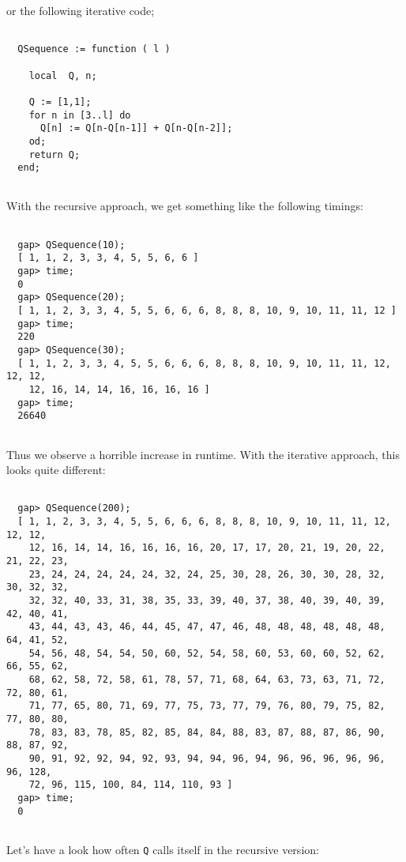 \documentclass[a4paper,11pt]{report}
\begin{document}
{{\begin{description}
\begin{Verbatim}[fontsize=\small,frame=single,label=GAP code]
\end{Verbatim}
 or the following iterative code; 
\begin{Verbatim}[fontsize=\small,frame=single,label=GAP code]
  
  QSequence := function ( l )
  
    local  Q, n;
  
    Q := [1,1];
    for n in [3..l] do
      Q[n] := Q[n-Q[n-1]] + Q[n-Q[n-2]];
    od;
    return Q;
  end;
  
\end{Verbatim}
 With the recursive approach, we get something like the following timings: 
\begin{Verbatim}[fontsize=\small,frame=single,label=GAP session log]
  
  gap> QSequence(10);
  [ 1, 1, 2, 3, 3, 4, 5, 5, 6, 6 ]
  gap> time;
  0
  gap> QSequence(20);
  [ 1, 1, 2, 3, 3, 4, 5, 5, 6, 6, 6, 8, 8, 8, 10, 9, 10, 11, 11, 12 ]
  gap> time;
  220
  gap> QSequence(30);
  [ 1, 1, 2, 3, 3, 4, 5, 5, 6, 6, 6, 8, 8, 8, 10, 9, 10, 11, 11, 12, 12, 12, 
    12, 16, 14, 14, 16, 16, 16, 16 ]
  gap> time;
  26640
  
\end{Verbatim}
 Thus we observe a horrible increase in runtime. With the iterative approach,
this looks quite different: 
\begin{Verbatim}[fontsize=\small,frame=single,label=GAP session log]
  
  gap> QSequence(200);
  [ 1, 1, 2, 3, 3, 4, 5, 5, 6, 6, 6, 8, 8, 8, 10, 9, 10, 11, 11, 12, 12, 12, 
    12, 16, 14, 14, 16, 16, 16, 16, 20, 17, 17, 20, 21, 19, 20, 22, 21, 22, 23, 
    23, 24, 24, 24, 24, 24, 32, 24, 25, 30, 28, 26, 30, 30, 28, 32, 30, 32, 32, 
    32, 32, 40, 33, 31, 38, 35, 33, 39, 40, 37, 38, 40, 39, 40, 39, 42, 40, 41, 
    43, 44, 43, 43, 46, 44, 45, 47, 47, 46, 48, 48, 48, 48, 48, 48, 64, 41, 52, 
    54, 56, 48, 54, 54, 50, 60, 52, 54, 58, 60, 53, 60, 60, 52, 62, 66, 55, 62, 
    68, 62, 58, 72, 58, 61, 78, 57, 71, 68, 64, 63, 73, 63, 71, 72, 72, 80, 61, 
    71, 77, 65, 80, 71, 69, 77, 75, 73, 77, 79, 76, 80, 79, 75, 82, 77, 80, 80, 
    78, 83, 83, 78, 85, 82, 85, 84, 84, 88, 83, 87, 88, 87, 86, 90, 88, 87, 92, 
    90, 91, 92, 92, 94, 92, 93, 94, 94, 96, 94, 96, 96, 96, 96, 96, 96, 128, 
    72, 96, 115, 100, 84, 114, 110, 93 ]
  gap> time;
  0
  
\end{Verbatim}
 Let's have a look how often \texttt{Q} calls itself in the recursive version:   
\begin{Verbatim}[fontsize=\small,frame=single,label=GAP code]
  

\end{Verbatim}
\end{description}}}
\end{document}
